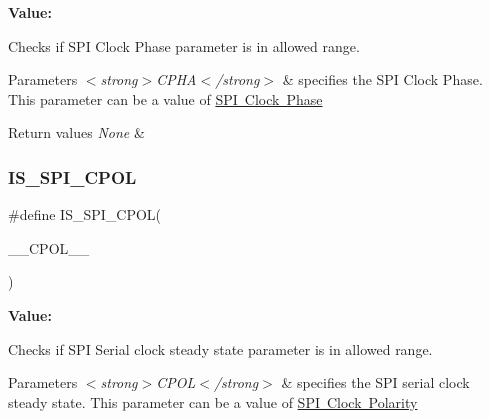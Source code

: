 {\bfseries Value\+:}
\begin{DoxyCode}{0}

\end{DoxyCode}


Checks if S\+PI Clock Phase parameter is in allowed range. 


\begin{DoxyParams}{Parameters}
{\em $<$strong$>$\+C\+P\+H\+A$<$/strong$>$} & specifies the S\+PI Clock Phase. This parameter can be a value of \mbox{\hyperlink{group___s_p_i___clock___phase}{S\+PI Clock Phase}} \\
\hline
\end{DoxyParams}

\begin{DoxyRetVals}{Return values}
{\em None} & \\
\hline
\end{DoxyRetVals}
\mbox{\label{group___s_p_i___private___macros_gad60cb1a9c1e1f89e8e9740a0ca734443}} 
\subsubsection{\texorpdfstring{IS\_SPI\_CPOL}{IS\_SPI\_CPOL}}
{\footnotesize\ttfamily \#define I\+S\+\_\+\+S\+P\+I\+\_\+\+C\+P\+OL(\begin{DoxyParamCaption}\item[{}]{\+\_\+\+\_\+\+C\+P\+O\+L\+\_\+\+\_\+ }\end{DoxyParamCaption})}

{\bfseries Value\+:}
\begin{DoxyCode}{0}

\end{DoxyCode}


Checks if S\+PI Serial clock steady state parameter is in allowed range. 


\begin{DoxyParams}{Parameters}
{\em $<$strong$>$\+C\+P\+O\+L$<$/strong$>$} & specifies the S\+PI serial clock steady state. This parameter can be a value of \mbox{\hyperlink{group___s_p_i___clock___polarity}{S\+PI Clock Polarity}} \\
\hline
\end{DoxyParams}

